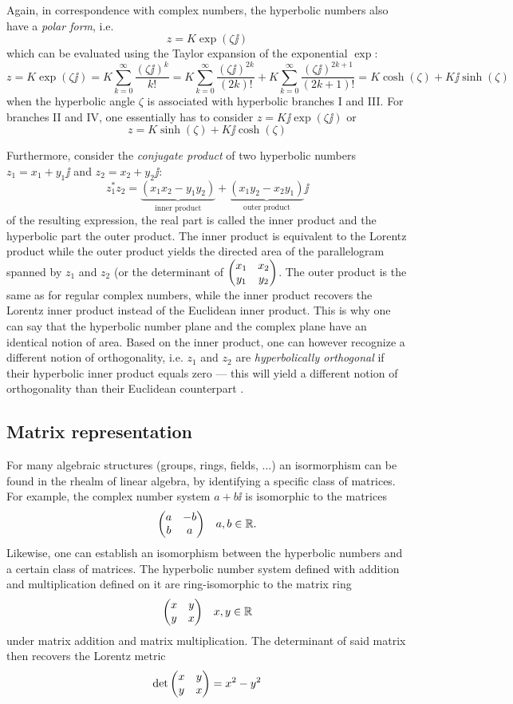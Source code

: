 Again, in correspondence with complex numbers, the hyperbolic numbers also have a  \emph{polar form}, i.e.
\[
     z = K \exp(\zeta \jj)
\]
which can be evaluated using the Taylor expansion of the exponential \(\exp\):
\[
     z = K\exp(\zeta \jj) = K \sum^\infty_{k = 0} \frac{(\zeta \jj)^k}{k!} =  K \sum^\infty_{k = 0} \frac{(\zeta \jj)^{2k}}{(2k)!} + K \sum^\infty_{k = 0} \frac{(\zeta \jj)^{2k+1}}{(2k + 1)!} = K\cosh(\zeta) + K\jj\sinh(\zeta)
\]
when the hyperbolic angle \(\zeta\) is associated with hyperbolic branches I and III. For branches II and IV, one essentially has to consider \(z = K\jj\exp(\zeta\jj)\) or
\[
     z = K\sinh(\zeta) + K\jj\cosh(\zeta)
\]

Furthermore, consider the \emph{conjugate product} of two hyperbolic numbers \(z_1 = x_1 + y_1\jj\) and \(z_2 = x_2 + y_2\jj\):
\[
     z_1^*z_2 = \underbrace{(x_1x_2 - y_1y_2)}_\text{inner product} 
            + \underbrace{(x_1y_2 - x_2y_1)}_\text{outer product}\jj
\]
of the resulting expression, the real part is called the inner product and the hyperbolic part the outer product. The inner product is equivalent to the Lorentz product while the outer product yields the directed area of the parallelogram spanned by \(z_1\) and \(z_2\) (or the determinant of \(\mqty(x_1 & x_2\\y_1&y_2)\). The outer product is the same as for regular complex numbers, while the inner product recovers the Lorentz inner product instead of the Euclidean inner product. This is why one can say that the hyperbolic number plane and the complex plane have an identical notion of area. Based on the inner product, one can however recognize a different notion of orthogonality, i.e. \(z_1\) and \(z_2\) are \emph{hyperbolically orthogonal} if their hyperbolic inner product equals zero --- this will yield a different notion of orthogonality than their Euclidean counterpart \cite{Needham1997, Sobczyk1995}.

\subsection{Matrix representation}
For many algebraic structures (groups, rings, fields, ...) an isormorphism can be found in the rhealm of linear algebra, by identifying a specific class of matrices. For example, the complex number system \(a + b\ii\) is isomorphic to the matrices
\[
     \mqty(a & -b \\ b & a) \quad a, b \in \real.
\]
Likewise, one can establish an isomorphism between the hyperbolic numbers and a certain class of matrices. The hyperbolic number system defined with addition and multiplication defined on it are ring-isomorphic to the matrix ring
\[
     \mqty(x & y \\ y & x) \quad x, y \in \real
\]
under matrix addition and matrix multiplication. The determinant of said matrix then recovers the Lorentz metric
\[
     \det \mqty(x & y \\ y & x) = x^2 - y^2
\]

